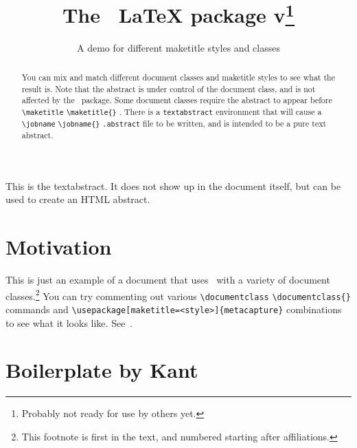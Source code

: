 \documentclass{scrarticle}
\title[plaintext={The metacapture LaTeX package},
       running={The \pkgname\ \LaTeX\ package v\pkgversion},
      ]{The \pkgname\ \textrm{\LaTeX} package v\pkgversion\footnote{Probably not ready for use by others yet.}}
\subtitle{A demo for different maketitle styles and classes}
\newcommand{\acmd}[2][]{%
  \def\FirstArg{#1}%
  \ifx\FirstArg\empty%
    \texttt{\textbackslash{}#2}%
  \else%
    \texttt{\textbackslash{}#2\{#1\}}%
  \fi
}
\begin{document}
\maketitle
\begin{abstract}

You can mix and match different document classes and maketitle styles to see what the result
is. Note that the abstract is under control of the document class, and is not affected
by the \pkgname\ package. Some document classes require the abstract to appear before
\acmd{maketitle}. There is a \texttt{textabstract} environment
that will cause a \acmd{jobname}\texttt{.abstract} file to be written, and is
intended to be a pure text abstract.
\end{abstract}
\begin{textabstract}
  This is the textabstract. It does not show up in the document itself, but can
  be used to create an HTML abstract.
\end{textabstract}

\section{Motivation}
This is just an example of a document that uses \pkgname\ with a variety of document
classes.\footnote{This footnote is first in the text, and numbered starting after affiliations.}
You can try commenting out various
\acmd{documentclass} commands and \texttt{\textbackslash{usepackage}[maketitle=\textless{style}\textgreater]\{metacapture\}}
combinations to see what it looks like. See~\cite{tugboat,falsehoods}.
  
\section{Boilerplate by Kant}
\kant[1-4]

\end{document}
